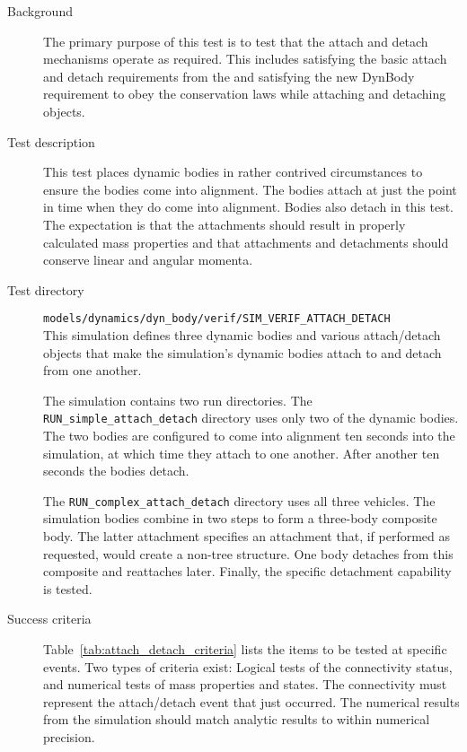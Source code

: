 \label{test:attach_detach}
\begin{description}
\item[Background] The primary purpose of this test is to test that
the \ModelDesc attach and detach mechanisms operate as required.
This includes satisfying the basic attach and detach requirements from
the \MASS and satisfying the new DynBody requirement to obey the conservation laws
while attaching and detaching objects.

\item[Test description]
This test places dynamic bodies in rather contrived circumstances to
ensure the bodies come into alignment. The bodies attach at just the point
in time when they do come into alignment. Bodies also detach in this test.
The expectation is that the attachments should result in properly calculated
mass properties and that attachments and detachments should conserve linear
and angular momenta.

\item[Test directory]
{\tt models/dynamics/dyn\_body/verif/SIM\_VERIF\_ATTACH\_DETACH} \\
This simulation defines three dynamic bodies and various \BODYACTION
attach/detach objects that make the simulation's dynamic bodies
attach to and detach from one another.

The simulation contains two run directories.
The \verb+RUN_simple_attach_detach+ directory uses only two of the
dynamic bodies. The two bodies are configured to come into alignment
ten seconds into the simulation, at which time they attach to one another.
After another ten seconds the bodies detach.

The \verb+RUN_complex_attach_detach+ directory uses all three vehicles.
The simulation bodies combine in two steps to form a three-body composite body.
The latter attachment specifies an attachment that, if performed as requested,
would create a non-tree structure.
One body detaches from this composite and reattaches later. Finally,
the specific detachment capability is tested.

\item[Success criteria]
Table~\ref{tab:attach_detach_criteria} lists the items to be tested at specific
events. Two types of criteria exist:
Logical tests of the connectivity status, and numerical tests of mass properties
and states. The connectivity must represent the attach/detach event that just
occurred. The numerical results from the simulation should match analytic
results to within numerical precision.


\end{description}
